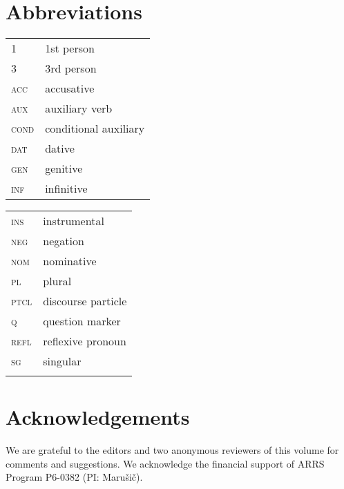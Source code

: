 \documentclass[output=paper,modfonts,newtxmath,hidelinks]{langscibook}
\begin{document}
\section*{Abbreviations}
\begin{tabularx}{.5\textwidth}{@{}lQ@{}}
\textsc{1}&1st person\\
\textsc{3}&3rd person\\
\textsc{acc}&{accusative}\\
\textsc{aux}&auxiliary verb\\
\textsc{cond}&conditional auxiliary\\
\textsc{dat}&{dative}\\
\textsc{gen}&{genitive}\\
\textsc{inf}&{infinitive}\\
\end{tabularx}%
\begin{tabularx}{.5\textwidth}{@{}lQ@{}}
\textsc{ins}&{instrumental}\\
\textsc{neg}&{negation}\\
\textsc{nom}&{nominative}\\
\textsc{pl}&{plural}\\
\textsc{ptcl}&{discourse particle}\\
\textsc{q}&question marker\\
\textsc{refl}&reflexive {pronoun}\\
\textsc{sg}&singular\\
&\\
\end{tabularx}


\section*{Acknowledgements}
We are grateful to the editors and two anonymous reviewers of this volume for comments and suggestions. We acknowledge the financial support of ARRS Program P6-0382 (PI: Marušič).

\sloppy
\printbibliography[heading=subbibliography,notkeyword=this]
\end{document}
